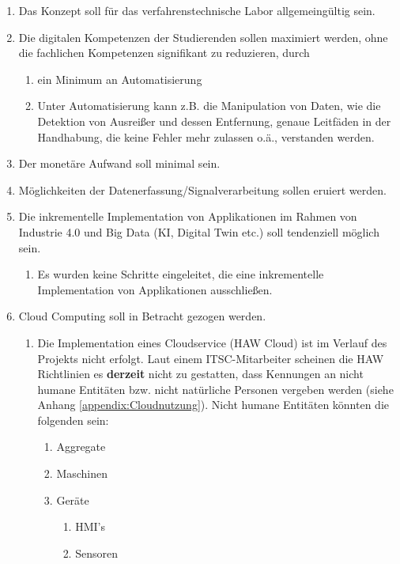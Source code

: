 \begin{enumerate}[leftmargin = 1.2em, label = \textbullet , itemsep = 0.1em]
\item[\cmark] Das Konzept soll für das verfahrenstechnische Labor allgemeingültig sein.
\item[\cmark] Die \glqq digitalen Kompetenzen\grqq{} der Studierenden sollen maximiert werden, ohne die fachlichen Kompetenzen signifikant zu reduzieren, durch 


	\begin{enumerate}[leftmargin = 1.2em, label = -- , itemsep = 0.1em]
	\item[\cmark] ein Minimum an Automatisierung 
	\item[\cmark] Unter Automatisierung kann z.B.  die Manipulation von Daten, wie die Detektion von Ausreißer und dessen Entfernung, genaue Leitfäden in der Handhabung, die keine Fehler mehr zulassen o.ä., verstanden werden.
	\end{enumerate}
	
\item[\cmark] Der monetäre Aufwand soll minimal sein.
\item[\cmark] Möglichkeiten der Datenerfassung/Signalverarbeitung sollen eruiert werden. 
\item[\cmark] Die inkrementelle Implementation von Applikationen im Rahmen von Industrie 4.0 und Big Data (KI, Digital Twin etc.) soll tendenziell möglich sein.
	\begin{enumerate}[leftmargin = 1.2em, label = $\diamond$ , itemsep = 0.1em]
	\item Es wurden keine Schritte eingeleitet, die eine inkrementelle Implementation von Applikationen ausschließen.
	\end{enumerate}


\item[\cmark] Cloud Computing soll in Betracht gezogen werden.
	\begin{enumerate}[leftmargin = 1.2em, label = $\diamond$ , itemsep = 0.1em]
	\item Die Implementation eines Cloudservice (HAW Cloud) ist im Verlauf des Projekts nicht erfolgt. Laut einem ITSC-Mitarbeiter scheinen die HAW Richtlinien es	\textbf{derzeit} nicht zu gestatten, dass Kennungen an nicht humane Entitäten bzw. nicht natürliche Personen vergeben werden (siehe Anhang \ref{appendix:Cloudnutzung}).	Nicht humane Entitäten könnten die folgenden sein:
	 
		\begin{enumerate}[leftmargin = 1.2em, label = - , itemsep = 0.1em]
		\item Aggregate
		\item Maschinen
		\item Geräte
			\begin{enumerate}[leftmargin = 1.2em, label = $\circ$ , itemsep = 0.1em]
			\item HMI's 
			\item Sensoren
			\end{enumerate} 
		\end{enumerate}
	\end{enumerate}
	

\end{enumerate}

